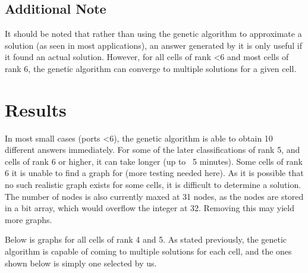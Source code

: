 \documentclass[12pt]{article}
\begin{document}
\subsection{Additional Note}

It should be noted that rather than using the genetic algorithm to approximate a solution (as seen in most applications), an answer generated by it is only useful if it found an actual solution. However, for all cells of rank \textless 6 and most cells of rank 6, the genetic algorithm can converge to multiple solutions for a given cell. 

\section{Results}

In most small cases (ports \textless 6), the genetic algorithm is able to obtain 10 different answers immediately. For some of the later classifications of rank 5, and cells of rank 6 or higher, it can take longer (up to ~5 minutes). Some cells of rank 6 it is unable to find a graph for (more testing needed here). As it is possible that no such realistic graph exists for some cells, it is difficult to determine a solution. The number of nodes is also currently maxed at 31 nodes, as the nodes are stored in a bit array, which would overflow the integer at 32. Removing this may yield more graphs.

Below is graphs for all cells of rank 4 and 5. As stated previously, the genetic algorithm is capable of coming to multiple solutions for each cell, and the ones shown below is simply one selected by us.
\end{document}
